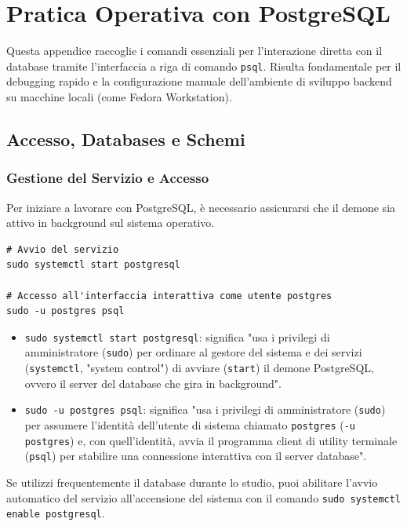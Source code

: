 \chapter{Pratica Operativa con PostgreSQL}
\label{app:postgres_pratica}

Questa appendice raccoglie i comandi essenziali per l'interazione diretta con il database tramite l'interfaccia a riga di comando \texttt{psql}. Risulta fondamentale per il debugging rapido e la configurazione manuale dell'ambiente di sviluppo backend su macchine locali (come Fedora Workstation).
\section{Accesso, Databases e Schemi}
\subsection{Gestione del Servizio e Accesso}

Per iniziare a lavorare con PostgreSQL, è necessario assicurarsi che il demone sia attivo in background sul sistema operativo.

\begin{lstlisting}[language=TerminalBash, title=Comandi Systemd (Fedora/Linux)]
# Avvio del servizio
sudo systemctl start postgresql

# Accesso all'interfaccia interattiva come utente postgres
sudo -u postgres psql
\end{lstlisting}

\begin{itemize}
    \item \texttt{sudo systemctl start postgresql}: significa "usa i privilegi di amministratore (\texttt{sudo}) per ordinare al gestore del sistema e dei servizi (\texttt{systemctl}, "system control") di avviare (\texttt{start}) il demone PostgreSQL, ovvero il server del database che gira in background".

    \item \texttt{sudo -u postgres psql}: significa "usa i privilegi di amministratore (\texttt{sudo}) per assumere l'identità dell'utente di sistema chiamato \texttt{postgres} (\texttt{-u postgres}) e, con quell'identità, avvia il programma client di utility terminale (\texttt{psql}) per stabilire una connessione interattiva con il server database".
\end{itemize}

\begin{tip}
Se utilizzi frequentemente il database durante lo studio, puoi abilitare l'avvio automatico del servizio all'accensione del sistema con il comando \texttt{sudo systemctl enable postgresql}.
\end{tip}

